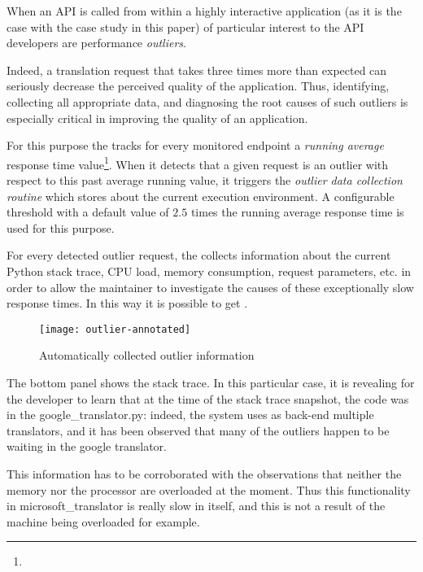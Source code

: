   When an API is called from within a highly interactive application (as it is the case with the case study in this paper) 
  of particular interest to the API developers are performance {\em outliers}. 

  Indeed, a translation request that takes three times more than expected can seriously decrease the perceived quality of the application. Thus, identifying, collecting all appropriate data, and diagnosing the root causes of such outliers is especially critical in improving the quality of an application. 
  
  
  For this purpose the \tool tracks for every monitored endpoint a {\em running average} response time value\footnote{}. When it detects that a given request is an outlier with respect to this past average running value, it triggers the {\em outlier data collection routine} which stores  about the current execution environment. A configurable threshold with a default value of $2.5$ times the running average response time is used for this purpose. 

  For every detected outlier request, the \tool collects information about the current Python stack trace, CPU load, memory consumption, request parameters, etc. in order to allow the maintainer to investigate the causes of these exceptionally slow response times. In this way it is possible to get .


  \begin{figure}[h!]
    \centering
    \texttt{[image: outlier-annotated]}
    \caption{Automatically collected outlier information}
    \label{fig:figure1}
  \end{figure}
  

The bottom panel shows the stack trace. 
In this particular case, it is revealing for the developer to learn that at the time of the stack trace snapshot, the code was in the google\_translator.py: indeed, the system uses as back-end multiple translators, and it has been observed that many of the outliers happen to be waiting in the google translator.

This information has to be corroborated with the observations that neither the memory nor the processor are overloaded at the moment. Thus this functionality in microsoft\_translator is really slow in itself, and this is not a result of the machine being overloaded for example. 










